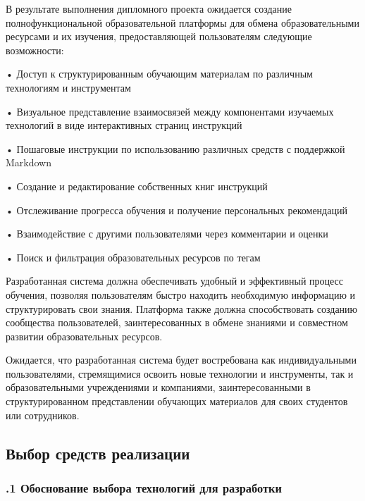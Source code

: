 {\gostFont

  \par \redline В результате выполнения дипломного проекта ожидается создание полнофункциональной образовательной платформы для обмена образовательными ресурсами и их изучения, предоставляющей пользователям следующие возможности:

  \par \redline • Доступ к структурированным обучающим материалам по различным технологиям и инструментам
  \par \redline • Визуальное представление взаимосвязей между компонентами изучаемых технологий в виде интерактивных страниц инструкций
  \par \redline • Пошаговые инструкции по использованию различных средств с поддержкой Mark\-down
  \par \redline • Создание и редактирование собственных книг инструкций
  \par \redline • Отслеживание прогресса обучения и получение персональных рекомендаций
  \par \redline • Взаимодействие с другими пользователями через комментарии и оценки
  \par \redline • Поиск и фильтрация образовательных ресурсов по тегам

  \par \redline Разработанная система должна обеспечивать удобный и эффективный процесс обучения, позволяя пользователям быстро находить необходимую информацию и структурировать свои знания. Платформа также должна способствовать созданию сообщества пользователей, заинтересованных в обмене знаниями и совместном развитии образовательных ресурсов.

  \par \redline Ожидается, что разработанная система будет востребована как индивидуальными пользователями, стремящимися освоить новые технологии и инструменты, так и образовательными учреждениями и компаниями, заинтересованными в структурированном представлении обучающих материалов для своих студентов или сотрудников.

  \par
}

\subsection*{
  \gostTitleFont
   Выбор средств реализации
}

\titlespace

\subsubsection*{ 
  \gostTitleFont
  .1 Обоснование выбора технологий для разработки
} 

